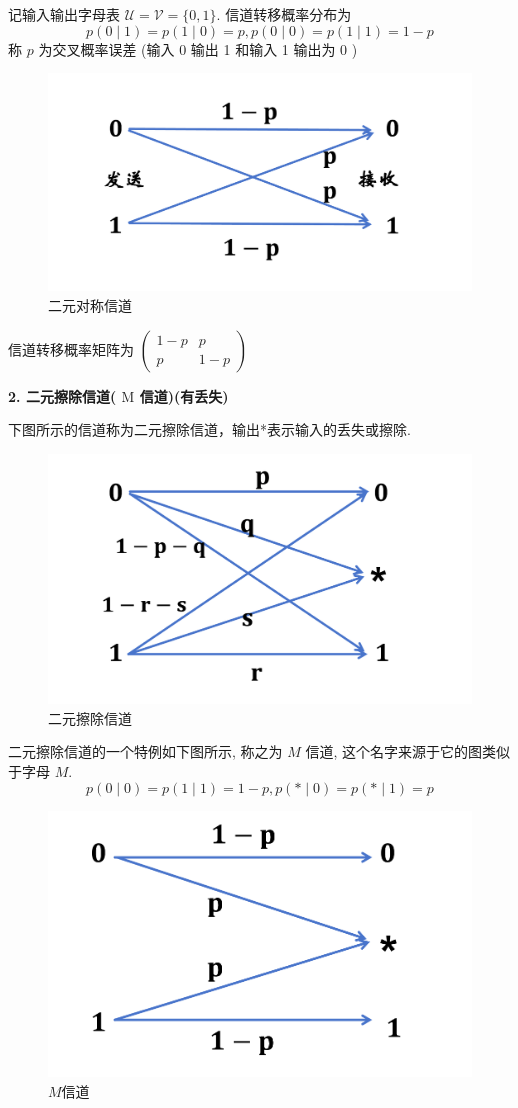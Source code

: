 记输入输出字母表 $ \mathscr{U}=\mathscr{V}=\{0,1\} $. 信道转移概率分布为
$$
p(0 \mid 1)=p(1 \mid 0)=p, p(0 \mid 0)=p(1 \mid 1)=1-p
$$
称 $ p $ 为交叉概率误差 (输入 0 输出 1 和输入 1 输出为 0 )

\begin{figure}[h]
    \centering
    \includegraphics[width=.6\linewidth]{image/3.png}
    \caption{二元对称信道}
\end{figure}

信道转移概率矩阵为
$ \left(\begin{array}{cc} 1-p & p \\ p & 1-p\end{array}\right) $

\textbf{2. 二元擦除信道( $\mathrm{M}$ 信道)(有丢失)}

下图所示的信道称为二元擦除信道，输出*表示输入的丢失或擦除.

\begin{figure}[h]
    \centering
    \includegraphics[width=0.5\linewidth]{image/4.png}
    \caption{二元擦除信道}
\end{figure}

二元擦除信道的一个特例如下图所示, 称之为 $ M $ 信道, 这个名字来源于它的图类似于字母 $ M $.
$$
p(0 \mid 0)=p(1 \mid 1)=1-p, p(* \mid 0)=p(* \mid 1)=p
$$
\begin{figure}[h]
    \centering
    \includegraphics[width=0.5\linewidth]{image/5.png}
    \caption{$M$信道}
\end{figure}

